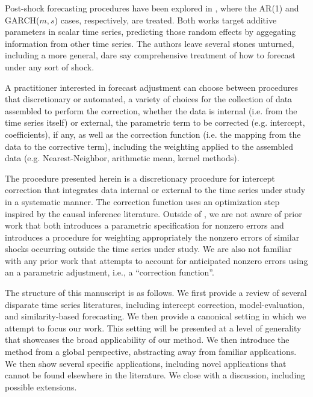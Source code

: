 \documentclass[11pt]{article}
\theoremstyle{definition}
\begin{document}
Post-shock forecasting procedures have been explored in \cite{lin2021minimizing,lundquist2024volatility}, where the AR(1) and GARCH($m,s$) cases, respectively, are treated.  Both works target additive parameters in scalar time series, predicting those random effects by aggegating information from other time series.  The authors leave several stones unturned, including a more general, dare say comprehensive treatment of how to forecast under any sort of shock.

A practitioner interested in forecast adjustment can choose between procedures that discretionary or automated, a variety of choices for the collection of data assembled to perform the correction, whether the data is internal (i.e. from the time series itself) or external, the parametric term to be corrected (e.g. intercept, coefficients), if any, as well as the correction function (i.e. the mapping from the data to the corrective term), including the weighting applied to the assembled data (e.g. Nearest-Neighbor, arithmetic mean, kernel methods).

The procedure presented herein is a discretionary procedure for intercept correction that integrates data internal or external to the time series under study in a systematic manner.  The correction function uses an optimization step inspired by the causal inference literature.  Outside of \citet{lin2021minimizing,lundquist2024volatility}, we are not aware of prior work that both introduces a parametric specification for nonzero errors and introduces a procedure for weighting appropriately the nonzero errors of similar shocks occurring outside the time series under study.  We are also not familiar with any prior work that attempts to account for anticipated nonzero errors using an a parametric adjustment, i.e., a ``correction function''.  

The structure of this manuscript is as follows.  We first provide a  review of several disparate time series literatures, including intercept correction, model-evaluation, and similarity-based forecasting.  We then provide a canonical setting in which we attempt to focus our work.  This setting will be presented at a level of generality that showcases the broad applicability of our method.  We then introduce the method from a global perspective, abstracting away from familiar applications.  We then show several specific applications, including novel applications that cannot be found elsewhere in the literature.  We close with a discussion, including possible extensions.
\end{document}
